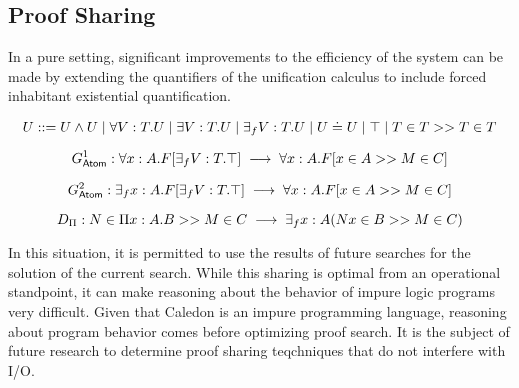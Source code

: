 \subsection{Proof Sharing}

In a pure setting, significant improvements to the efficiency of the system can be made by 
extending the quantifiers of the unification calculus to include forced inhabitant existential quantification.

\[
U ::= U \wedge U 
 \; | \; \forall V : T . U
 \; | \; \exists V : T . U 
 \; | \; \exists_f V : T . U 
 \; | \; U \doteq U
 \; | \; \top
 \; | \; T \in T >> T \in T
\]

\[
G^1_{\mathsf{Atom}} : \forall x : A . F[\exists_f V : T . \top]  \;\longrightarrow\; \forall x : A . F[x \in A >> M \in C]
\]

\[
G^2_{\mathsf{Atom}} : \exists_f x : A . F[\exists_f V : T . \top]  \;\longrightarrow\; \forall x : A . F[x \in A >> M \in C]
\]

\[
D_\Pi : N\in \Pi x : A . B >> M \in C \;\longrightarrow\; \exists_f x : A ( N x \in B >> M \in C)
\]

In this situation, it is permitted to use the results of future searches for the solution of the current search.
While this sharing is optimal from an operational standpoint, it can make reasoning about the behavior 
of impure logic programs very difficult.  Given that Caledon is an impure programming language, reasoning about program
behavior comes before optimizing proof search.  It is the subject of future research to determine proof sharing teqchniques
that do not interfere with I/O. 
